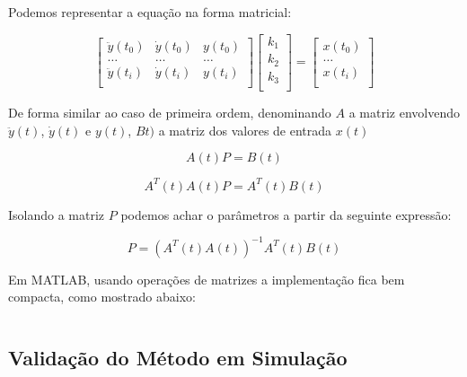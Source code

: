 \documentclass[a4paper,11pt]{article}
\begin{document}

Podemos representar a equação na forma matricial:

\begin{equation}
\left[\begin{array}{ccc}
    \ddot{y}(t_0) & \dot{y}(t_0) & y(t_0)\\
    \dots  & \dots & \dots \\
    \ddot{y}(t_i) & \dot{y}(t_i) & y(t_i)\\
\end{array} \right]
\left[\begin{array}{c}
    k_1\\
    k_2\\
    k_3\\
\end{array} \right]
=
\left[\begin{array}{c}
    x(t_0)  \\
    \dots\\
    x(t_i)  \\
\end{array} \right]
\end{equation}


De forma similar ao caso de primeira ordem, denominando $A$ a matriz envolvendo $\ddot{y}(t)$, $\dot{y}(t)$ e $y(t)$, $Bt)$ a matriz dos valores de entrada $x(t)$

\begin{equation}
    A(t) P = B(t)
\end{equation}

\begin{equation}
    A^T(t)A(t) P = A^T(t) B(t)
\end{equation}

Isolando a matriz $P$ podemos achar o parâmetros a partir da seguinte expressão:

\begin{equation}
    P = \left(A^T(t) A(t)\right)^{-1} A^T(t) B(t)
\end{equation}

Em MATLAB, usando operações de matrizes a implementação fica bem compacta, como mostrado abaixo:

\inputminted[frame=single,framesep=10pt]{matlab}{../src/matlab/secondordertf.m}

\subsection{Validação do Método em Simulação}
\end{document}
